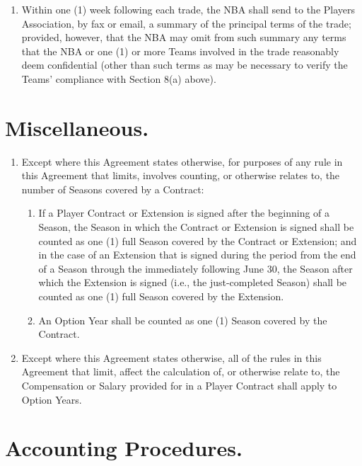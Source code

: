\documentclass[
]{book}
\providecommand{\tightlist}{%
  \setlength{\itemsep}{0pt}\setlength{\parskip}{0pt}}
\begin{document}
\begin{enumerate}
\item
  Within one (1) week following each trade, the NBA shall send to the Players Association, by fax or email, a summary of the principal terms of the trade; provided, however, that the NBA may omit from such summary any terms that the NBA or one (1) or more Teams involved in the trade reasonably deem confidential (other than such terms as may be necessary to verify the Teams' compliance with Section 8(a) above).
\end{enumerate}

\hypertarget{miscellaneous.}{%
\section{Miscellaneous.}\label{miscellaneous.}}

\begin{enumerate}
\def\labelenumi{(\alph{enumi})}
\tightlist
\item
  Except where this Agreement states otherwise, for purposes of any rule in this Agreement that limits, involves counting, or otherwise relates to, the number of Seasons covered by a Contract:

  \begin{enumerate}
  \def\labelenumii{(\arabic{enumii})}
  \tightlist
  \item
    If a Player Contract or Extension is signed after the beginning of a Season, the Season in which the Contract or Extension is signed shall be counted as one (1) full Season covered by the Contract or Extension; and in the case of an Extension that is signed during the period from the end of a Season through the immediately following June 30, the Season after which the Extension is signed (i.e., the just-completed Season) shall be counted as one (1) full Season covered by the Extension.
  \item
    An Option Year shall be counted as one (1) Season covered by the Contract.
  \end{enumerate}
\item
  Except where this Agreement states otherwise, all of the rules in this Agreement that limit, affect the calculation of, or otherwise relate to, the Compensation or Salary provided for in a Player Contract shall apply to Option Years.
\end{enumerate}

\hypertarget{accounting-procedures.}{%
\section{Accounting Procedures.}\label{accounting-procedures.}}
\end{document}
